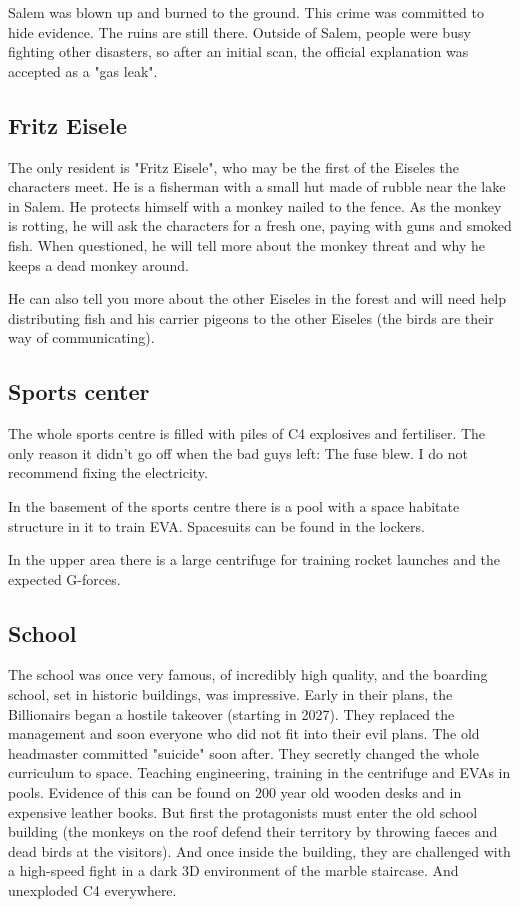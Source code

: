 Salem was blown up and burned to the ground. This crime was committed to hide evidence. The ruins are still there. Outside of Salem, people were busy fighting other disasters, so after an initial scan, the official explanation was accepted as a "gas leak".

\subsection{Fritz Eisele}
The only resident is "Fritz Eisele", who may be the first of the Eiseles the characters meet. He is a fisherman with a small hut made of rubble near the lake in Salem.
He protects himself with a monkey nailed to the fence. As the monkey is rotting, he will ask the characters for a fresh one, paying with guns and smoked fish.
When questioned, he will tell more about the monkey threat and why he keeps a dead monkey around.

He can also tell you more about the other Eiseles in the forest and will need help distributing fish and his carrier pigeons to the other Eiseles (the birds are their way of communicating).

\subsection{Sports center}

The whole sports centre is filled with piles of C4 explosives and fertiliser. The only reason it didn't go off when the bad guys left: The fuse blew. I do not recommend fixing the electricity.

In the basement of the sports centre there is a pool with a space habitate structure in it to train EVA. Spacesuits can be found in the lockers.

In the upper area there is a large centrifuge for training rocket launches and the expected G-forces.

\subsection{School}

The school was once very famous, of incredibly high quality, and the boarding school, set in historic buildings, was impressive. Early in their plans, the Billionairs began a hostile takeover (starting in 2027). They replaced the management and soon everyone who did not fit into their evil plans. The old headmaster committed "suicide" soon after.
They secretly changed the whole curriculum to space. Teaching engineering, training in the centrifuge and EVAs in pools.
Evidence of this can be found on 200 year old wooden desks and in expensive leather books.
But first the protagonists must enter the old school building (the monkeys on the roof defend their territory by throwing faeces and dead birds at the visitors). And once inside the building, they are challenged with a high-speed fight in a dark 3D environment of the marble staircase. And unexploded C4 everywhere.

